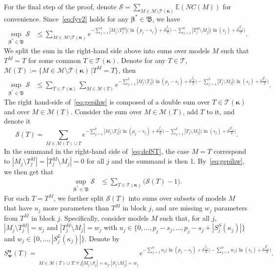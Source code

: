 \documentclass[
  12pt]{article}
\newcommand{\E}{\mathbb{E}}
\newcommand{\M}{\mathcal{M}}
\newcommand{\T}{\mathcal{T}}
\newcommand{\bu}{\mathbf{u}}
\newcommand{\bw}{\mathbf{w}}
\newcommand{\bbeta}{\boldsymbol{\beta}}
\newcommand{\bB}{\mathfrak{B}}
\newcommand{\bkappa}{\boldsymbol{\kappa}}
\begin{document}
For the final step of the proof, denote $\mathcal{S}= \sum_{M \in \M\setminus \T(\bkappa)} \E\left(NC(M)\right)$ for convenience. Since~\eqref{eq:fyv2} holds for any $\bbeta^*\in\bB$, we have
\begin{align*}
    \sup_{\bbeta^*\in\bB }\mathcal{S} &\leq \sum_{M \in \M\setminus \T(\bkappa)}e^{- \sum_{j=1}^b |M_j\setminus T^M_j|\big(\ln(p_j-s_j)+\delta \tfrac{f_j}{2}\big)-\sum_{j=1}^b |T^M_j\setminus M_j|\big(\ln(s_j)+\delta \tfrac{g'_j}{2}\big)}.
\end{align*}
We split the sum in the right-hand side above into sums over models $M$ %
such that $T^M=T$ for some common $T\in \T(\bkappa)$. Denote for any $T\in \T$, $\M(T):=\{M \in \M\setminus \T(\bkappa) \,| T^M=T\}$, then
\begin{align}\label{eq:gepihw}
    \sup_{\bbeta^*\in\bB }\mathcal{S} &\leq \sum_{T \in \T(\bkappa)}\sum_{M \in \M(T)}e^{- \sum_{j=1}^b |M_j\setminus T_j|\big(\ln(p_j-s_j)+\delta \tfrac{f_j}{2}\big)-\sum_{j=1}^b |T_j\setminus M_j|\big(\ln(s_j)+\delta \tfrac{g'_j}{2}\big)}.
\end{align}
The right hand-side of~\eqref{eq:gepihw} is composed of a double sum over $T \in \T(\bkappa)$ and over $M \in \M(T)$. Consider the sum over $M \in \M(T)$, add $T$ to it, and denote it
\begin{equation}\label{eq:defST}
  \mathcal{S}(T)=\sum_{M \in \M(T) \cup T}e^{- \sum_{j=1}^b |M_j\setminus T_j|\big(\ln(p_j-s_j)+\delta \tfrac{f_j}{2}\big)-\sum_{j=1}^b |T_j\setminus M_j|\big(\ln(s_j)+\delta \tfrac{g'_j}{2}\big)}.
\end{equation}
In the summand in the right-hand side of~\eqref{eq:defST}, the case $M=T$ correspond to $|M_j\setminus T^M_j|=|T^M_j\setminus M_j|=0$ for all $j$ and the summand is then 1.
By~\eqref{eq:gepihw}, we then get that
\begin{align}\label{eq:gepihw2}
    \sup_{\bbeta^*\in\bB}\mathcal{S} &\leq \sum_{T \in \T(\bkappa)}\big(\mathcal{S}(T)-1\big).
\end{align}
For each $T=T^M$, we further split $\mathcal{S}(T)$ into sums over subsets of models $M$ that have $u_j$ more parameters than $T^M$ in block $j$, and are missing $w_j$ parameters from $T^M$ in block $j$.
Specifically, consider models $M$ such that, for all $j$, $|M_j\setminus T^M_j|=u_j$ and $|T^M_j\setminus M_j|=w_j$ with $u_j \in \{0,\ldots,p_j-s_j,\ldots,p_j-s_j+|S_j^{S}(\kappa_j)|\}$ and $w_j \in \{0,\ldots,|S_j^{L}(\kappa_j)|\}$. Denote by
$$S^{\bu}_{\bw}(T)=\sum_{M \in \M(T) \cup T:\forall \,j |M_j\setminus S_j|=u_j, |S_j\setminus M_j|=w_j } e^{- \sum_{j=1}^b u_j\big(\ln(p_j-s_j)+\delta \tfrac{f_j}{2}\big)-\sum_{j=1}^b w_j\big(\ln(s_j)+\delta \tfrac{g'_j}{2}\big)}.$$
\end{document}
